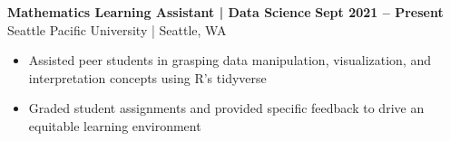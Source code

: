 \textbf{Mathematics Learning Assistant | Data Science} \hfill \textbf{Sept 2021 -- Present} \\
    Seattle Pacific University | Seattle, WA
    \squish
    \begin{itemize} \setlength\itemsep{-2pt}
        \item Assisted peer students in grasping data manipulation, visualization, and interpretation concepts using R's {tidyverse}
        \item Graded student assignments and provided specific feedback to drive an equitable learning environment
    \end{itemize}